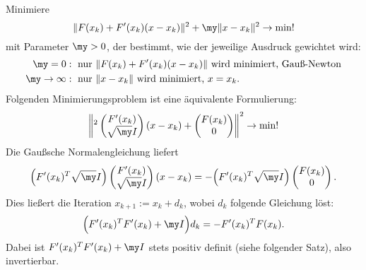Minimiere
\[
	\| F(x_k) + F'(x_k)(x-x_k) \|^2 + \my \|x-x_k\|^2 \to \min!
\]
mit Parameter $\my > 0$, der bestimmt, wie der jeweilige Ausdruck gewichtet wird:
\begin{align*}
	\my = 0 &: \text{ nur $\|F(x_k) + F'(x_k)(x-x_k)\|$ wird minimiert, Gauß-Newton} \\
	\my \to \infty &: \text{ nur $\|x-x_k\|$ wird minimiert, $x = x_k$}.
\end{align*}
Folgenden Minimierungsproblem ist eine äquivalente Formulierung:
\[
	\left\|^2
	\begin{pmatrix}
		F'(x_k) \\
		\sqrt{\my} I
	\end{pmatrix}
	(x-x_k)
	+ \begin{pmatrix}
		F(x_k) \\
		0
	\end{pmatrix}
	\right\|^2 \to \min!
\]
Die Gaußsche Normalengleichung liefert
\[
	\Big( F'(x_k)^T \sqrt{\my} I \Big)
	\begin{pmatrix}
		F'(x_k) \\
		\sqrt{\my} I
	\end{pmatrix}
	(x-x_k)
	=
	- \Big(F'(x_k)^T \sqrt{\my} I \Big)
	\begin{pmatrix}
		F(x_k) \\
		0
	\end{pmatrix}.
\]
Dies ließert die Iteration $x_{k+1} := x_k + d_k$, wobei $d_k$ folgende Gleichung löst:
\[
	\Big( F'(x_k)^T F'(x_k) + \my I \Big) d_k
	= - F'(x_k)^T F(x_k).
\]
Dabei ist $F'(x_k)^T F'(x_k) + \my I$ stets positiv definit (siehe folgender Satz), also invertierbar.

